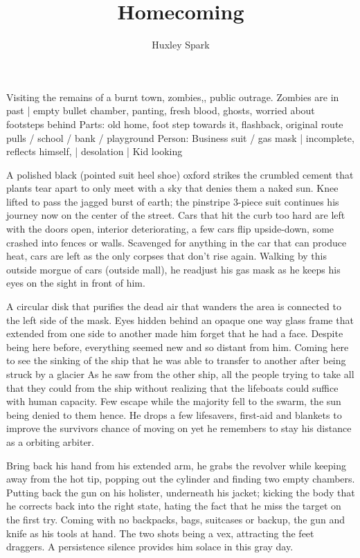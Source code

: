 \title{Homecoming}
\author{Huxley Spark}
\begin{Outline}
        Visiting the remains of a burnt town, zombies,, public outrage. Zombies are in past | empty bullet chamber, panting, fresh blood, ghosts, worried about
    footsteps behind
    Parts: old home, foot step towards it, flashback, original route pulls / school / bank / playground
    Person: Business suit / gas mask | incomplete, reflects himself, | desolation | Kid looking
\end{Outline}
\begin{Document}
        A polished black (pointed suit heel shoe) oxford strikes the crumbled cement that plants tear apart to only meet with a sky that denies them a naked
    sun. Knee lifted to pass the jagged burst of earth; the pinstripe 3-piece suit continues his journey now on the center of the street. Cars that hit the
    curb too hard are left with the doors open, interior deteriorating, a few cars flip upside-down, some crashed into fences or walls. Scavenged for anything
    in the car that can produce heat, cars are left as the only corpses that don't rise again. Walking by this outside morgue of cars  (outside mall), he
    readjust his gas mask as he keeps his eyes on the sight in front of him.

        A circular disk that purifies the dead air that wanders the area is connected to the left side of the mask. Eyes hidden behind an opaque one way glass
    frame that extended from one side to another made him forget that he had a face. Despite being here before, everything seemed new and so distant from him.
    Coming here to see the sinking of the ship that he was able to transfer to another after being struck by a glacier  As he saw from the other ship, all the
    people trying to take all that they could from the ship without realizing that the lifeboats could suffice with human capacity. Few escape while the majority
    fell to the swarm, the sun being denied to them hence. He drops a few lifesavers, first-aid and blankets to improve the survivors chance of moving on yet
    he remembers to stay his distance as a orbiting arbiter.

        Bring back his hand from his extended arm, he grabs the revolver while keeping away from the hot tip, popping out the cylinder and finding two empty
    chambers. Putting back the gun on his holister, underneath his jacket; kicking the body that he corrects back into the right state, hating the fact that he
    miss the target on the first try. Coming with no backpacks, bags, suitcases or backup, the gun and knife as his tools at hand. The two shots being a vex,
    attracting the feet draggers. A persistence silence provides him solace in this gray day.


\end{Document}
